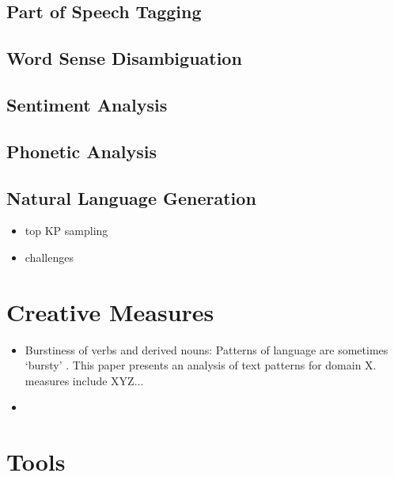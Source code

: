 \subsection{Part of Speech Tagging}

\subsection{Word Sense Disambiguation}

\subsection{Sentiment Analysis}

\subsection{Phonetic Analysis}

\subsection{Natural Language Generation}
\begin{itemize}
    \item top KP sampling
    \item challenges 
\end{itemize}


\section{Creative Measures}
\begin{itemize}
    \item Burstiness of verbs and derived nouns: Patterns of language are sometimes `bursty' \cite{pierrehumbert_burstiness_2012}. This paper presents an analysis of text patterns for domain X. measures include XYZ...
    \item 
\end{itemize}

\section{Tools}
